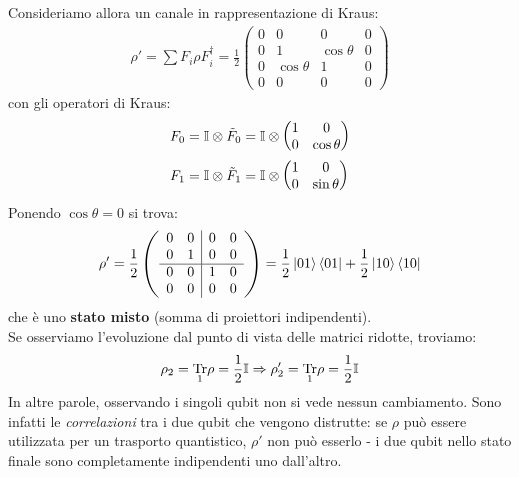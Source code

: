 \documentclass[../../InformazioneQuantistica.tex]{subfiles}
\begin{document}
Consideriamo allora un canale in rappresentazione di Kraus:
\begin{align*}
\rho' = \sum F_i \rho F_i^\dag = \frac{1}{2}\left(
\begin{array}{cc|cc}
0 & 0 & 0 & 0\\ 
0 & 1 & \cos\theta & 0\\ \hline
0 & \cos\theta & 1 & 0\\
0 & 0 & 0 & 0
\end{array}
\right)
\end{align*}
con gli operatori di Kraus:
\begin{align*}
F_0 &= \mathbb{I} \otimes \tilde{F}_0 = \mathbb{I}\otimes \begin{pmatrix} 1 & 0\\ 0 & \cos\theta\end{pmatrix}\\
F_1 &= \mathbb{I}\otimes \tilde{F}_1 = \mathbb{I}\otimes \begin{pmatrix}1 & 0\\ 0 & \sin\theta\end{pmatrix}
\end{align*}
Ponendo $\cos\theta = 0$ si trova:
\begin{align*}
\rho' = \frac{1}{2}\left(
\begin{array}{cc|cc}
0 & 0 & 0 & 0\\ 
0 & 1 & 0 & 0\\ \hline
0 & 0 & 1 & 0\\
0 & 0 & 0 & 0
\end{array}
\right) = \frac{1}{2}\Ket{01}\Bra{01} + \frac{1}{2}\Ket{10}\Bra{10}
\end{align*}
che è uno \textbf{stato misto} (somma di proiettori indipendenti).\\

Se osserviamo l'evoluzione dal punto di vista delle matrici ridotte, troviamo:
\begin{align*}
\rho_2 = \underset{1}{\operatorname{Tr}}\rho = \frac{1}{2}\mathbb{I}\Rightarrow \rho_2' = \underset{1}{\operatorname{Tr}}\rho = \frac{1}{2}\mathbb{I}
\end{align*}
In altre parole, osservando i singoli qubit non si vede nessun cambiamento. Sono infatti le \textit{correlazioni} tra i due qubit che vengono distrutte: se $\rho$ può essere utilizzata per un trasporto quantistico, $\rho'$ non può esserlo - i due qubit nello stato finale sono completamente indipendenti uno dall'altro.
\end{document}
